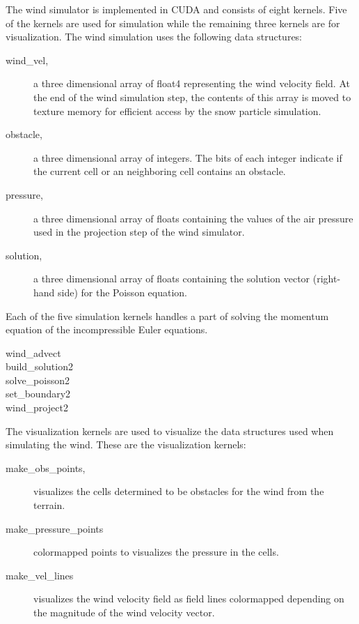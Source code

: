 The wind simulator is implemented in CUDA and consists of eight kernels. Five of 
the kernels are used for simulation while the remaining three kernels are for 
visualization. The wind simulation uses the following data structures:

\begin{description}
	\item[wind\_vel,] a three dimensional array of float4 representing the wind 
	velocity field. At the end of the wind simulation step, the contents of this 
	array is moved to texture memory for efficient access by the snow particle 
	simulation. 
	\item[obstacle,] a three dimensional array of integers. The bits of each 
	integer indicate if the current cell or an neighboring cell contains an 
	obstacle. 
	\item[pressure,] a three dimensional array of floats containing the values 
	of the air pressure used in the projection step of the wind simulator. 
	\item[solution,] a three dimensional array of floats containing the solution 
	vector (right-hand side) for the Poisson equation. 
\end{description}

Each of the five simulation kernels handles a part of solving the momentum equation 
of the incompressible Euler equations.
\begin{description}
	\item[wind\_advect]
	\item[build\_solution2]
	\item[solve\_poisson2]
	\item[set\_boundary2]
	\item[wind\_project2]
\end{description}

The visualization kernels are used to visualize the data structures used when 
simulating the wind. These are the visualization kernels:

\begin{description}
	\item[make\_obs\_points,] visualizes the cells determined to be obstacles 
	for the wind from the terrain. 
	\item[make\_pressure\_points] colormapped points to visualizes the pressure 
	in the cells. 
	\item[make\_vel\_lines] visualizes the wind velocity field as field lines 
	colormapped depending on the magnitude of the wind velocity vector. 
\end{description}

